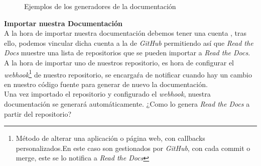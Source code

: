 \begin{figure}[H]
    \centering
    \caption{Ejemplos de los generadores de la documentación}
\end{figure}
\textbf{Importar nuestra Documentación}\\
A la hora de importar nuestra documentación debemos tener una cuenta , tras ello, podemos vincular dicha cuenta a la de \emph{GitHub} permitiendo así que \emph{Read the Docs} muestre una lista de repositorios que se pueden importar a \emph{Read the Docs}. A la hora de importar uno de nuestros repositorio, es hora de configurar el \emph{webhook}\footnote{Método de alterar una aplicación o página web, con callbacks personalizados.En este caso son gestionados por \emph{GitHub}, con cada commit o merge, este se lo notifica a \emph{Read the Docs}} de nuestro repositorio, se encargaŕa de notificar cuando hay un cambio en nuestro código fuente para generar de nuevo la documentación.\\
Una vez importado el repositorio y configurado el \emph{webhook}, nuestra documentación se generará automáticamente. ¿Como lo genera \emph{Read the Docs} a partir del repositorio?\\
